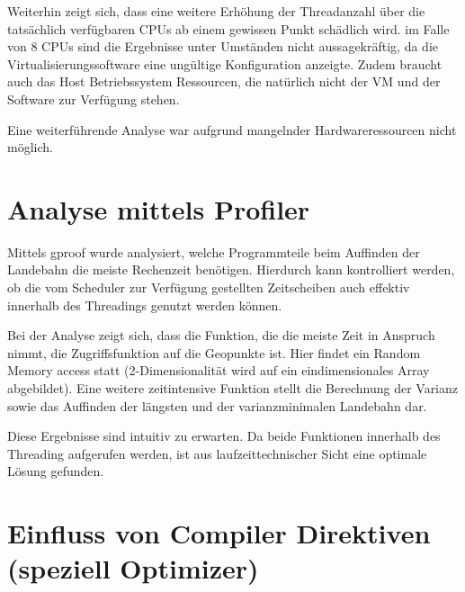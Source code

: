 \documentclass[10pt,a4paper]{report}
\begin{document}
Weiterhin zeigt sich, dass eine weitere Erhöhung der Threadanzahl über die tatsächlich verfügbaren CPUs ab einem gewissen Punkt schädlich wird.
im Falle von 8 CPUs sind die Ergebnisse unter Umständen nicht aussagekräftig, da die Virtualisierungssoftware eine ungültige Konfiguration anzeigte. Zudem braucht auch das Host Betriebssystem Ressourcen, die natürlich nicht der VM und der Software zur Verfügung stehen.

  
Eine weiterführende Analyse war aufgrund mangelnder Hardwareressourcen nicht möglich.


\section{Analyse mittels Profiler}

Mittels gproof wurde analysiert, welche Programmteile beim Auffinden der Landebahn die meiste Rechenzeit benötigen. Hierdurch kann kontrolliert werden, ob die vom Scheduler zur Verfügung gestellten Zeitscheiben auch effektiv innerhalb des Threadings genutzt werden können. 

Bei der Analyse zeigt sich, dass die Funktion, die die meiste Zeit in Anspruch nimmt, die Zugriffsfunktion auf die Geopunkte ist. Hier findet ein Random Memory access statt (2-Dimensionalität wird auf ein eindimensionales Array abgebildet).
Eine weitere zeitintensive Funktion stellt die Berechnung der Varianz sowie das Auffinden der längsten und der varianzminimalen Landebahn dar.

Diese Ergebnisse sind intuitiv zu erwarten.
Da beide Funktionen innerhalb des Threading aufgerufen werden, ist aus laufzeittechnischer Sicht eine optimale Lösung gefunden. 

\section{Einfluss von Compiler Direktiven (speziell Optimizer)}
\end{document}
